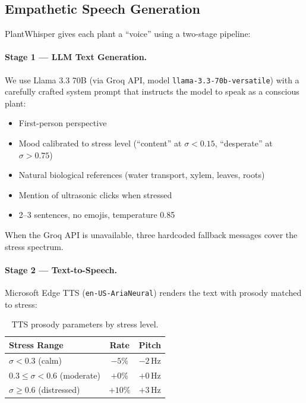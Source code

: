\documentclass[11pt,a4paper,twocolumn]{article}
\begin{document}
\subsection{Empathetic Speech Generation}

PlantWhisper gives each plant a ``voice'' using a two-stage pipeline:

\paragraph{Stage 1 --- LLM Text Generation.} We use Llama 3.3 70B (via Groq API, model \texttt{llama-3.3-70b-versatile}) with a carefully crafted system prompt that instructs the model to speak as a conscious plant:
\begin{itemize}[nosep]
    \item First-person perspective
    \item Mood calibrated to stress level (``content'' at $\sigma < 0.15$, ``desperate'' at $\sigma > 0.75$)
    \item Natural biological references (water transport, xylem, leaves, roots)
    \item Mention of ultrasonic clicks when stressed
    \item 2--3 sentences, no emojis, temperature 0.85
\end{itemize}

When the Groq API is unavailable, three hardcoded fallback messages cover the stress spectrum.

\paragraph{Stage 2 --- Text-to-Speech.} Microsoft Edge TTS (\texttt{en-US-AriaNeural}) renders the text with prosody matched to stress:

\begin{table}[H]
\centering
\caption{TTS prosody parameters by stress level.}
\label{tab:tts}
\begin{tabular}{@{}lcc@{}}
\toprule
\textbf{Stress Range} & \textbf{Rate} & \textbf{Pitch} \\
\midrule
$\sigma < 0.3$ (calm) & $-5\%$ & $-2$\,Hz \\
$0.3 \leq \sigma < 0.6$ (moderate) & $+0\%$ & $+0$\,Hz \\
$\sigma \geq 0.6$ (distressed) & $+10\%$ & $+3$\,Hz \\
\bottomrule
\end{tabular}
\end{table}
\end{document}
